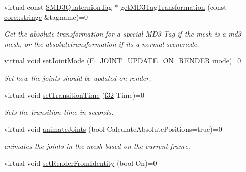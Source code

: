\begin{DoxyCompactItemize}
\mbox{\label{classirr_1_1scene_1_1IAnimatedMeshSceneNode_abb3c2cee9c3271014c8615907d98c021}} 
virtual const \hyperlink{structirr_1_1scene_1_1SMD3QuaternionTag}{S\+M\+D3\+Quaternion\+Tag} $\ast$ \hyperlink{classirr_1_1scene_1_1IAnimatedMeshSceneNode_abb3c2cee9c3271014c8615907d98c021}{get\+M\+D3\+Tag\+Transformation} (const \hyperlink{namespaceirr_1_1core_ab26a0e0359206b5a694f35c37c829d7f}{core\+::stringc} \&tagname)=0
\begin{DoxyCompactList}\small\item\em Get the absolute transformation for a special M\+D3 Tag if the mesh is a md3 mesh, or the absolutetransformation if it\textquotesingle{}s a normal scenenode. \end{DoxyCompactList}\item 
\mbox{\label{classirr_1_1scene_1_1IAnimatedMeshSceneNode_a5ff68cb07badfbb01f491c0371c8b459}} 
virtual void \hyperlink{classirr_1_1scene_1_1IAnimatedMeshSceneNode_a5ff68cb07badfbb01f491c0371c8b459}{set\+Joint\+Mode} (\hyperlink{namespaceirr_1_1scene_a4a36461b5fa197ca3c6636c043413fa5}{E\+\_\+\+J\+O\+I\+N\+T\+\_\+\+U\+P\+D\+A\+T\+E\+\_\+\+O\+N\+\_\+\+R\+E\+N\+D\+ER} mode)=0
\begin{DoxyCompactList}\small\item\em Set how the joints should be updated on render. \end{DoxyCompactList}\item 
virtual void \hyperlink{classirr_1_1scene_1_1IAnimatedMeshSceneNode_a424d2dc577842949094a9d8c2a3eba0e}{set\+Transition\+Time} (\hyperlink{namespaceirr_a0277be98d67dc26ff93b1a6a1d086b07}{f32} Time)=0
\begin{DoxyCompactList}\small\item\em Sets the transition time in seconds. \end{DoxyCompactList}\item 
virtual void \hyperlink{classirr_1_1scene_1_1IAnimatedMeshSceneNode_a76af2c9a2b0cea6ee2b3559c1f32f850}{animate\+Joints} (bool Calculate\+Absolute\+Positions=true)=0
\begin{DoxyCompactList}\small\item\em animates the joints in the mesh based on the current frame. \end{DoxyCompactList}\item 
virtual void \hyperlink{classirr_1_1scene_1_1IAnimatedMeshSceneNode_aa3aa695d2e949bbc2ff17429951e77d0}{set\+Render\+From\+Identity} (bool On)=0

\end{DoxyCompactItemize}
